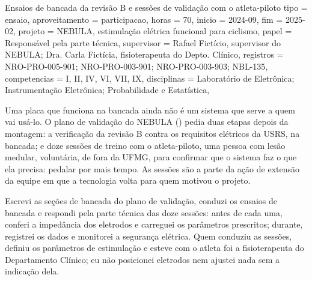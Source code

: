 \begin{atividade}{Ensaios de bancada da revisão B e sessões de validação com o atleta-piloto}{
  tipo         = ensaio,
  aproveitamento = participacao,
  horas        = 70,
  inicio       = 2024-09,
  fim          = 2025-02,
  projeto      = {NEBULA, estimulação elétrica funcional para ciclismo},
  papel        = {Responsável pela parte técnica},
  supervisor   = {Rafael Fictício, supervisor do NEBULA; Dra. Carla Fictícia, fisioterapeuta do Depto. Clínico},
  registros    = {NRO-PRO-005-901; NRO-PRO-003-901; NRO-PRO-003-903; NBL-135},
  competencias = {I, II, IV, VI, VII, IX},
  disciplinas  = {Laboratório de Eletrônica; Instrumentação Eletrônica; Probabilidade e Estatística},
}

\begin{contexto}
Uma placa que funciona na bancada ainda não é um sistema que serve a quem vai usá-lo. O plano de
validação do NEBULA () pedia duas etapas depois da montagem: a verificação
da revisão B contra os requisitos elétricos da USRS, na bancada; e doze sessões de treino com o
atleta-piloto, uma pessoa com lesão medular, voluntária, de fora da UFMG, para confirmar que o
sistema faz o que ela precisa: pedalar por mais tempo. As sessões são a parte da ação de extensão da
equipe em que a tecnologia volta para quem motivou o projeto.
\end{contexto}

\begin{contribuicao}
Escrevi as seções de bancada do plano de validação, conduzi os ensaios de bancada e respondi pela
parte técnica das doze sessões: antes de cada uma, conferi a impedância dos eletrodos e carreguei os
parâmetros prescritos; durante, registrei os dados e monitorei a segurança elétrica. Quem conduziu as
sessões, definiu os parâmetros de estimulação e esteve com o atleta foi a fisioterapeuta do
Departamento Clínico; eu não posicionei eletrodos nem ajustei nada sem a indicação dela.
\end{contribuicao}

\begin{desenvolvimento}


\end{desenvolvimento}
\end{atividade}
